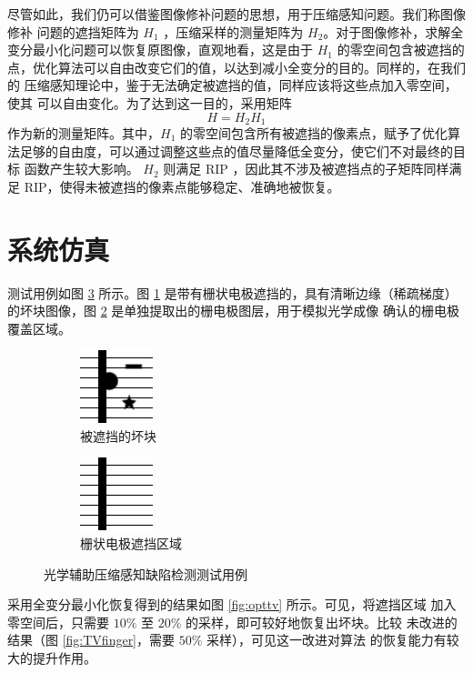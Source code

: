 尽管如此，我们仍可以借鉴图像修补问题的思想，用于压缩感知问题。我们称图像修补
问题的遮挡矩阵为 $H_1$ ，压缩采样的测量矩阵为 $H_2$。对于图像修补，求解全
变分最小化问题可以恢复原图像，直观地看，这是由于 $H_1$ 的零空间包含被遮挡的
点，优化算法可以自由改变它们的值，以达到减小全变分的目的。同样的，在我们的
压缩感知理论中，鉴于无法确定被遮挡的值，同样应该将这些点加入零空间，使其
可以自由变化。为了达到这一目的，采用矩阵
\begin{equation}
H = H_2 H_1
\end{equation}
作为新的测量矩阵。其中，$H_1$ 的零空间包含所有被遮挡的像素点，赋予了优化算
法足够的自由度，可以通过调整这些点的值尽量降低全变分，使它们不对最终的目标
函数产生较大影响。 $H_2$ 则满足 RIP ，因此其不涉及被遮挡点的子矩阵同样满足
RIP，使得未被遮挡的像素点能够稳定、准确地被恢复。

\section{系统仿真}

测试用例如图 \ref{fig:opttestdata} 所示。图 \ref{fig:opttestdata:in}
是带有栅状电极遮挡的，具有清晰边缘（稀疏梯度）的坏块图像，图
\ref{fig:opttestdata:finger} 是单独提取出的栅电极图层，用于模拟光学成像
确认的栅电极覆盖区域。

\begin{figure}
\centering
\begin{subfigure}[h]{1.5in}
\includegraphics{Figure/testdata/2dsharp_finger.png}
\caption{被遮挡的坏块}
\label{fig:opttestdata:in}
\end{subfigure}
\begin{subfigure}[h]{1.5in}
\includegraphics{Figure/testdata/finger.png}
\caption{栅状电极遮挡区域}
\label{fig:opttestdata:finger}
\end{subfigure}
\caption{光学辅助压缩感知缺陷检测测试用例}
\label{fig:opttestdata}
\end{figure}

采用全变分最小化恢复得到的结果如图 \ref{fig:opttv} 所示。可见，将遮挡区域
加入零空间后，只需要 $10\%$ 至 $20\%$ 的采样，即可较好地恢复出坏块。比较
未改进的结果（图 \ref{fig:TVfinger}，需要 $50\%$ 采样），可见这一改进对算法
的恢复能力有较大的提升作用。

